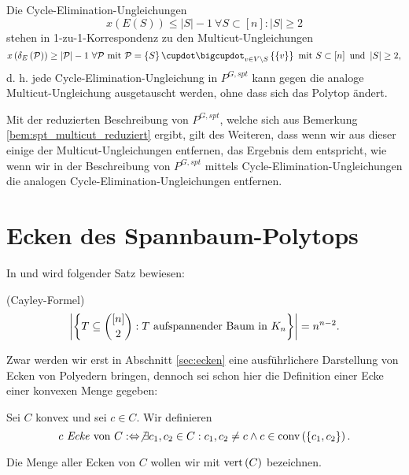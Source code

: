 \documentclass[10p,a4paper,BCOR = 12mm, DIV=15]{scrbook}
\begin{document}
\begin{Bem}
\label{bem:spt_multicut_austausch}
Die Cycle-Elimination-Ungleichungen
\begin{displaymath}
x\left(E\left(S\right)\right) \leq \left|S\right|-1\ \forall S \subset \left[n\right]: \left|S\right| \geq 2
\end{displaymath}
stehen in 1-zu-1-Korrespondenz zu den Multicut-Ungleichungen 
\begin{displaymath}
x\left(\delta_E\left(\mathcal{P}\right)\right) \geq \left|\mathcal{P}\right|-1\ \forall \mathcal{P} \textnormal{ mit } \mathcal{P} = \left\{S\right\} \cupdot \bigcupdot_{v \in V \backslash S} \left\{\left\{v\right\}\right\} \textnormal{ mit } S \subset \left[n\right] \textnormal{ und } \left|S\right| \geq 2,
\end{displaymath}
d. h. jede Cycle-Elimination-Ungleichung in $P^{G, spt}$ kann gegen die analoge Multicut-Ungleichung ausgetauscht werden, ohne dass sich das Polytop ändert.

Mit der reduzierten Beschreibung von $P^{G, spt}$, welche sich aus Bemerkung \ref{bem:spt_multicut_reduziert} ergibt, gilt des Weiteren, dass wenn wir aus dieser einige der Multicut-Ungleichungen entfernen, das Ergebnis dem entspricht, wie wenn wir in der Beschreibung von $P^{G, spt}$ mittels Cycle-Elimination-Ungleichungen die analogen Cycle-Elimination-Unglei\-ch\-un\-gen entfernen.
\end{Bem}

\section{Ecken des Spannbaum-Polytops}

In \cite{matousek2007diskrete} und \cite{lovasz_combinatorics} wird folgender Satz bewiesen:
\begin{Sa}
(Cayley-Formel)
\begin{displaymath}
\left|\left\{T \subseteq {\left[n\right] \choose 2}: T\textnormal{ aufspannender Baum in }K_n\right\}\right| = n^{n-2}.
\end{displaymath}
\end{Sa}

Zwar werden wir erst in Abschnitt \ref{sec:ecken} eine ausführlichere Darstellung von Ecken von Polyedern bringen, dennoch sei schon hier die Definition einer Ecke einer konvexen Menge gegeben:

\begin{Def}
\label{def:ecke}
Sei $C$ konvex und sei $c \in C$. Wir definieren
\begin{displaymath}
c \textnormal{ \emph{Ecke} von }C :\Leftrightarrow \not\exists c_1, c_2 \in C: c_1, c_2 \neq c \wedge c \in \operatorname{conv} \left(\left\{c_1, c_2\right\}\right).
\end{displaymath}

Die Menge aller Ecken von $C$ wollen wir mit $\operatorname{vert} \left(C\right)$ bezeichnen.
\end{Def}
\end{document}
